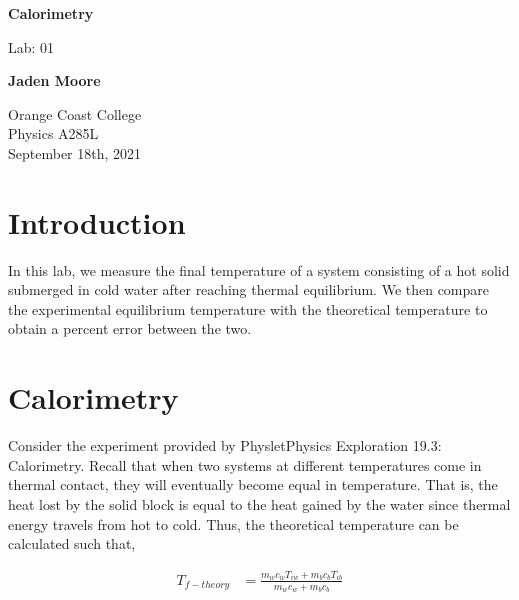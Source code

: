 \documentclass[12pt]{article}
\begin{document}

\begin{titlepage}
    \begin{center}
        \vspace*{1cm}
        \textbf{Calorimetry}

        \vspace{0.5cm}
        Lab: 01

        \vspace{1cm}

        \textbf{Jaden Moore}

        \vfill

        Orange Coast College\\
        Physics A285L\\
        September 18th, 2021

    \end{center}
\end{titlepage}

\pagestyle{fancy}
\fancyhf{}
\setlength{\headheight}{15pt}
\cfoot{\thepage}

\section{Introduction}
In this lab, we measure the final temperature of a system consisting of a hot solid submerged in cold water after reaching thermal equilibrium. We then compare the experimental equilibrium temperature with the theoretical temperature to obtain a percent error between the two.

\section{Calorimetry}
Consider the experiment provided by Physlet\textregistered \space Physics Exploration 19.3: Calorimetry. Recall that when two systems at different temperatures come in thermal contact, they will eventually become equal in temperature. That is, the heat lost by the solid block is equal to the heat gained by the water since thermal energy travels from hot to cold. Thus, the theoretical temperature can be calculated such that,

\begin{equation}
    \begin{split}
        T_{f-theory} &= \frac{m_wc_wT_{iw} + m_bc_bT_{ib}}{m_wc_w+m_bc_b}
    \end{split}
\end{equation}
\end{document}
